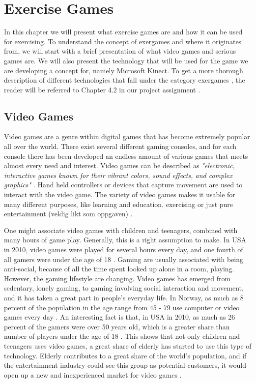 \chapter{Exercise Games}
In this chapter we will present what exercise games are and how it can be used for exercising. To understand the concept of exergames and where it originates from, we will start with a brief presentation of what video games and serious games are. We will also present the technology that will be used for the game we are developing a concept for, namely Microsoft Kinect. To get a more thorough description of different technologies that fall under the category exergames , the reader will be referred to Chapter 4.2 in our project assignment \cite{project}.

\section{Video Games}

Video games are a genre within digital games that has become extremely popular all over the world. There exist several different gaming consoles, and for each console there has been developed an endless amount of various games that meets almost every need and interest. Video games can be described as \emph{"electronic, interactive games known for their vibrant colors, sound effects, and complex graphics"} \cite{videogamedef}. Hand held controllers or devices that capture movement are used to interact with the video game. The variety of video games makes it usable for many different purposes, like learning and education, exercising or just pure entertainment (veldig likt som oppgaven) \cite{project}. 

One might associate video games with children and teenagers, combined with many hours of game play. Generally, this is a right assumption to make. In USA in 2010, video games were played for several hours every day, and one fourth of all gamers were under the age of 18 \cite{videogames2010}. Gaming are usually associated with being anti-social, because of all the time spent looked up alone in a room, playing. However, the gaming lifestyle are changing. Video games has emerged from sedentary, lonely gaming, to gaming involving social interaction and movement, and it has taken a great part in people's everyday life. In Norway, as much as 8 percent of the population in the age range from 45 - 79 use computer or video games every day \cite{mediebarometer2011}. An interesting fact is that, in USA in 2010, as much as 26 percent of the gamers were over 50 years old, which is a greater share than number of players under the age of 18 \cite{videogames2010}. This shows that not only children and teenagers uses video games, a great share of elderly has started to use this type of technology. Elderly contributes to a great share of the world's population, and if the entertainment industry could see this group as potential customers, it would open up a new and inexperienced market for video games \cite{ijsselsteijn2007digital}. 

